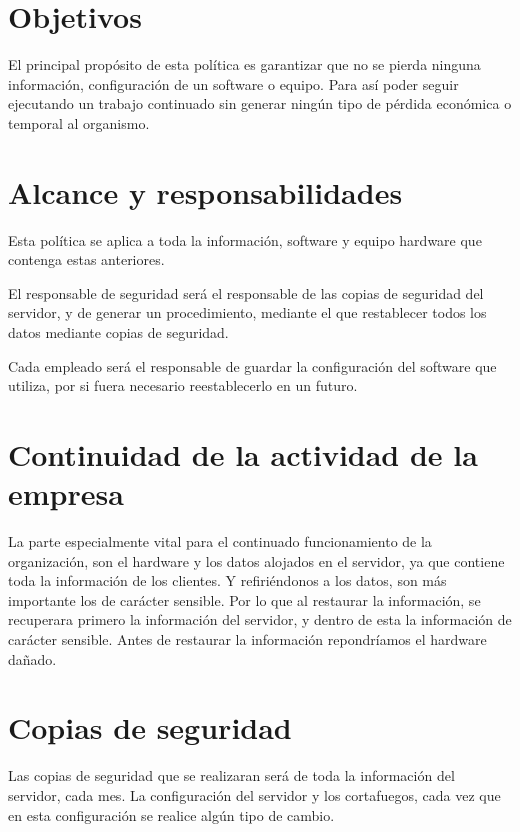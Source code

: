 \documentclass[11pt,bibtotoc,noliststotoc,BCOR0mm]{scrbook}
\begin{document}
\section{Objetivos}

El principal propósito de esta política es garantizar que no se pierda ninguna información, configuración de un software o equipo. Para así poder seguir ejecutando un trabajo continuado sin generar ningún tipo de pérdida económica o temporal al organismo. 

\section{Alcance y responsabilidades}

Esta política se aplica a toda la información, software y equipo hardware que contenga estas anteriores.

El responsable de seguridad será el responsable de las copias de seguridad del servidor, y de generar un procedimiento, mediante el que restablecer todos los datos mediante copias de seguridad.

Cada empleado será el responsable de guardar la configuración del software que utiliza, por si fuera necesario reestablecerlo en un futuro. 

\section{Continuidad de la actividad de la empresa}

La parte especialmente vital para el continuado funcionamiento de la organización, son el hardware y los datos alojados en el servidor, ya que contiene toda la información de los clientes. Y refiriéndonos a los datos, son más importante los de carácter sensible. Por lo que al restaurar la información, se recuperara primero la información del servidor, y dentro de esta la información de carácter sensible. Antes de restaurar la información repondríamos el hardware dañado. 

\section{Copias de seguridad}
\label{sec:copias-de-seguridad}

Las copias de seguridad que se realizaran será de toda la información del servidor, cada mes. La configuración del servidor y los cortafuegos, cada vez que en esta configuración se realice  algún tipo de cambio.
\end{document}
